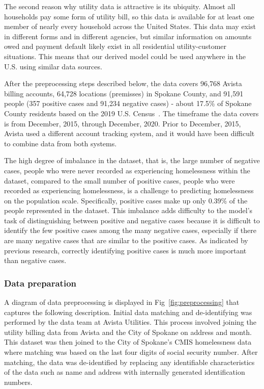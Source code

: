 \documentclass[10pt,letterpaper]{article}
\begin{document}
The second reason why utility data is attractive is its ubiquity. Almost all households pay some form of utility bill, so this data is available for at least one member of nearly every household across the United States. This data may exist in different forms and in different agencies, but similar information on amounts owed and payment default likely exist in all residential utility-customer situations. This means that our derived model could be used anywhere in the U.S. using similar data sources.

After the preprocessing steps described below, the data covers 96,768 Avista billing accounts, 64,728 locations (premisses) in Spokane County, and 91,591 people (357 positive cases and 91,234 negative cases) - about 17.5\% of Spokane County residents based on the 2019 U.S. Census~\cite{SpokanePop}. The timeframe the data covers is from December, 2015, through December, 2020. Prior to December, 2015, Avista used a different account tracking system, and it would have been difficult to combine data from both systems. 

The high degree of imbalance in the dataset, that is, the large number of negative cases, people who were never recorded as experiencing homelessness within the dataset, compared to the small number of positive cases, people who were recorded as experiencing homelessness, is a challenge to predicting homelessness on the population scale. Specifically, positive cases make up only 0.39\% of the people represented in the dataset. This imbalance adds difficulty to the model's task of distinguishing between positive and negative cases because it is difficult to identify the few positive cases among the many negative cases, especially if there are many negative cases that are similar to the positive cases. As indicated by previous research, correctly identifying positive cases is much more important than negative cases.

\subsubsection*{Data preparation}
A diagram of data preprocessing is displayed in Fig~\ref{fig:preprocessing} that captures the following description. Initial data matching and de-identifying was performed by the data team at Avista Utilities. This process involved joining the utility billing data from Avista and the City of Spokane on address and month. This dataset was then joined to the City of Spokane's CMIS homelessness data where matching was based on the last four digits of social security number. After matching, the data was de-identified by replacing any identifiable characteristics of the data such as name and address with internally generated identification numbers. 
\end{document}
